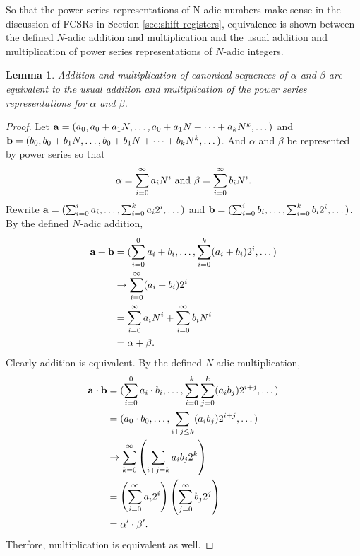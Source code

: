 \documentclass[english]{article}
\theoremstyle{plain}
\newtheorem{lemma}[theorem]{Lemma}%
\theoremstyle{definition}
\theoremstyle{remark}
\begin{document}
\par So that the power series representations of N-adic numbers make sense in
the discussion of FCSRs in Section \ref{sec:shift-registers}, equivalence is
shown between the defined $N$-adic addition and multiplication and the usual
addition and multiplication of power series representations of $N$-adic
integers.

\begin{lemma}
  Addition and multiplication of canonical sequences of $\alpha$ and $\beta$ are
  equivalent to the usual addition and multiplication of the power series
  representations for $\alpha$ and $\beta$.
\end{lemma}
\begin{proof}
  Let ${\bf a}=(a_0,a_0+a_1N,\dots,a_0+a_1N+\cdots+a_kN^k,\dots)$
  and ${\bf b}=(b_0,b_0+b_1N,\dots,b_0+b_1N+\cdots+b_kN^k,\dots)$. And $\alpha$
  and $\beta$ be represented by power series so that
  \[
    \alpha=\sum_{i=0}^\infty a_iN^i{\rm \ and\ } \beta=\sum_{i=0}^\infty b_iN^i.
  \]
  Rewrite ${\bf a}=(\sum_{i=0}^ia_i,\dots,\sum_{i=0}^ka_i2^i,\dots)$ and
  ${\bf b}=(\sum_{i=0}^ib_i,\dots,\sum_{i=0}^kb_i2^i,\dots)$. By the defined
  $N$-adic addition,
  \begin{align*}
    {\bf a}+{\bf b}&=(\sum_{i=0}^0a_i+b_i,\dots,\sum_{i=0}^k(a_i+b_i)2^i,\dots)\\
                &\rightarrow\sum_{i=0}^\infty(a_i+b_i)2^i\\
                &=\sum_{i=0}^\infty a_iN^i + \sum_{i=0}^\infty b_iN^i\\
                &=\alpha+\beta.
  \end{align*}
  Clearly addition is equivalent. By the defined $N$-adic multiplication,
  \begin{align*}
    {\bf a}\cdot{\bf b}
      &=(\sum_{i=0}^0a_i\cdot b_i,\dots,\sum_{i=0}^k\sum_{j=0}^k(a_ib_j)2^{i+j},\dots)\\
      &=(a_0\cdot b_0,\dots,\sum_{i+j\leq k}(a_ib_j)2^{i+j},\dots)\\
      &\rightarrow\sum_{k=0}^\infty\left(\sum_{i+j=k}a_ib_j2^k\right)\\
      &=\left(\sum_{i=0}^\infty a_i2^i\right)\left(\sum_{j=0}^\infty b_j2^j\right)\\
      &=\alpha'\cdot\beta'.
  \end{align*}
  Therfore, multiplication is equivalent as well.
\end{proof}
\end{document}
